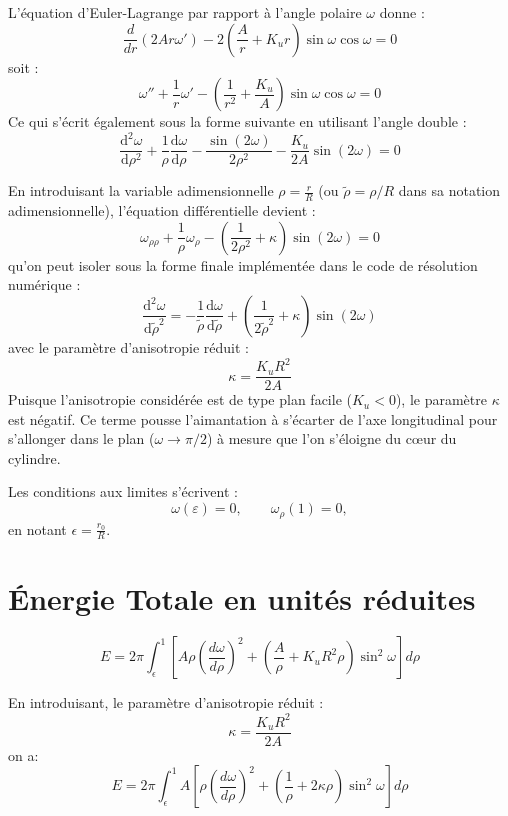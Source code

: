 \documentclass[11pt,a4paper]{article}
\begin{document}
L'équation d'Euler-Lagrange par rapport à l'angle polaire $\omega$ donne :
\[
\frac{d}{dr}(2Ar\omega')
-
2\left(\frac{A}{r}+K_u r\right)\sin\omega\cos\omega=0
\]
soit :
\[
\boxed{
\omega''
+\frac1r\omega'
-
\left(\frac1{r^2}+\frac{K_u}{A}\right)
\sin\omega\cos\omega
=0
}
\]
Ce qui s'écrit également sous la forme suivante en utilisant l'angle double :
\begin{equation}
    \frac{\text{d}^2\omega}{\text{d}\rho^2} + \frac{1}{\rho}\frac{\text{d}\omega}{\text{d}\rho} - \frac{\sin(2\omega)}{2\rho^2} - \frac{K_u}{2A}\sin(2\omega) = 0
\end{equation}

En introduisant la variable adimensionnelle $\rho = \frac{r}{R}$ (ou $\tilde{\rho} = \rho/R$ dans sa notation adimensionnelle), l'équation différentielle devient :
\[
\omega_{\rho\rho}
+\frac{1}{\rho}\omega_\rho
-\left(\frac{1}{2 \rho^2} + \kappa\right)\sin(2\omega)
= 0
\]
qu'on peut isoler sous la forme finale implémentée dans le code de résolution numérique :
\begin{equation}
    \frac{\text{d}^2\omega}{\text{d}\tilde{\rho}^2} = -\frac{1}{\tilde{\rho}}\frac{\text{d}\omega}{\text{d}\tilde{\rho}} + \left(\frac{1}{2\tilde{\rho}^2} + \kappa\right)\sin(2\omega)
\end{equation}
avec le paramètre d'anisotropie réduit :
\[
\kappa = \frac{K_u R^2}{2A}
\]
Puisque l'anisotropie considérée est de type plan facile ($K_u < 0$), le paramètre $\kappa$ est négatif. Ce terme pousse l'aimantation à s'écarter de l'axe longitudinal pour s'allonger dans le plan ($\omega \to \pi/2$) à mesure que l'on s'éloigne du cœur du cylindre.

Les conditions aux limites s'écrivent :
\[
\omega(\varepsilon)=0,
\qquad
\omega_\rho(1)=0,
\]
en notant $\epsilon = \frac{r_0}{R}$.


\section{Énergie Totale en unités réduites}
\[
\boxed{
E=2\pi \int_\epsilon^1
\left[
A \rho (\frac{d \omega}{d\rho})^2+
\left(\frac{A}{\rho}+K_u R^2 \rho\right)\sin^2\omega
\right]d\rho
}
\]

En introduisant, le paramètre d'anisotropie réduit :
\[
\kappa = \frac{K_u R^2}{2A}
\]
on a:
\[
\boxed{
E=2\pi \int_\epsilon^1  A
\left[
\rho \left(\frac{d \omega}{d\rho}\right)^2+
\left(\frac{1}{\rho}+2 \kappa  \rho\right)\sin^2\omega
\right]d\rho
}
\]
\end{document}
